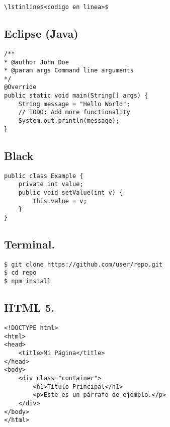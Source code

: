 \begin{lstlisting}[caption={A simple listing.}, label={lst:simple}]
	\lstinline$<codigo en linea>$
\end{lstlisting}




\subsection{Eclipse (Java)}

	\begin{lstlisting}[style=eclipse]
/**
* @author John Doe
* @param args Command line arguments
*/
@Override
public static void main(String[] args) {
	String message = "Hello World";
	// TODO: Add more functionality
	System.out.println(message);
}
	\end{lstlisting}
	
\subsection{Black}
	
	\begin{lstlisting}[style=black]
public class Example {
	private int value;
	public void setValue(int v) {
		this.value = v;
	}
}
	\end{lstlisting}
	
\subsection{Terminal.}

	\begin{lstlisting}[style=terminal]
$ git clone https://github.com/user/repo.git
$ cd repo
$ npm install
	\end{lstlisting}
	
	





\subsection{HTML 5.}

	\begin{lstlisting}[language=HTML5]
<!DOCTYPE html>
<html>
<head>
	<title>Mi Página</title>
</head>
<body>
	<div class="container">
		<h1>Título Principal</h1>
		<p>Este es un párrafo de ejemplo.</p>
	</div>
</body>
</html>
	\end{lstlisting}

